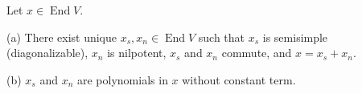 Let $x \in \operatorname{End} V$.

(a) There exist unique $x_s, x_n \in \operatorname{End} V$ such that $x_s$ is semisimple (diagonalizable), $x_n$ is nilpotent, $x_s$ and $x_n$ commute, and $x = x_s + x_n$.

(b) $x_s$ and $x_n$ are polynomials in $x$ without constant term.
